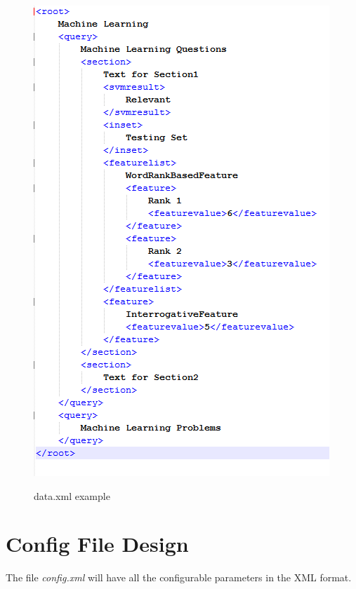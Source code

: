 \documentclass[10pt,a4paper]{report}
\begin{document}
\begin{figure}[h!]
\centering
\includegraphics[width=\textwidth]{./diagrams/xml}\\
\caption{data.xml example}
\end{figure}

\clearpage

\section{Config File Design}

The file \textit{config.xml} will have all the configurable parameters in the XML format. \\
\end{document}
